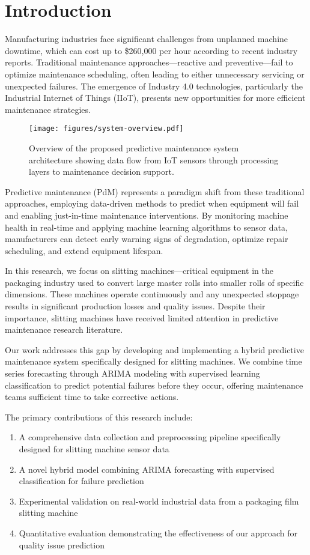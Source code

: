 \section{Introduction}
Manufacturing industries face significant challenges from unplanned machine downtime, which can cost up to \$260,000 per hour according to recent industry reports. Traditional maintenance approaches—reactive and preventive—fail to optimize maintenance scheduling, often leading to either unnecessary servicing or unexpected failures. The emergence of Industry 4.0 technologies, particularly the Industrial Internet of Things (IIoT), presents new opportunities for more efficient maintenance strategies.

\begin{figure}[t]
\centering
\texttt{[image: figures/system-overview.pdf]}
\caption{Overview of the proposed predictive maintenance system architecture showing data flow from IoT sensors through processing layers to maintenance decision support.}
\label{fig:system_overview}
\end{figure}

Predictive maintenance (PdM) represents a paradigm shift from these traditional approaches, employing data-driven methods to predict when equipment will fail and enabling just-in-time maintenance interventions. By monitoring machine health in real-time and applying machine learning algorithms to sensor data, manufacturers can detect early warning signs of degradation, optimize repair scheduling, and extend equipment lifespan.

In this research, we focus on slitting machines—critical equipment in the packaging industry used to convert large master rolls into smaller rolls of specific dimensions. These machines operate continuously and any unexpected stoppage results in significant production losses and quality issues. Despite their importance, slitting machines have received limited attention in predictive maintenance research literature.

Our work addresses this gap by developing and implementing a hybrid predictive maintenance system specifically designed for slitting machines. We combine time series forecasting through ARIMA modeling with supervised learning classification to predict potential failures before they occur, offering maintenance teams sufficient time to take corrective actions.

The primary contributions of this research include:
\begin{enumerate}
    \item A comprehensive data collection and preprocessing pipeline specifically designed for slitting machine sensor data
    \item A novel hybrid model combining ARIMA forecasting with supervised classification for failure prediction
    \item Experimental validation on real-world industrial data from a packaging film slitting machine
    \item Quantitative evaluation demonstrating the effectiveness of our approach for quality issue prediction
\end{enumerate}